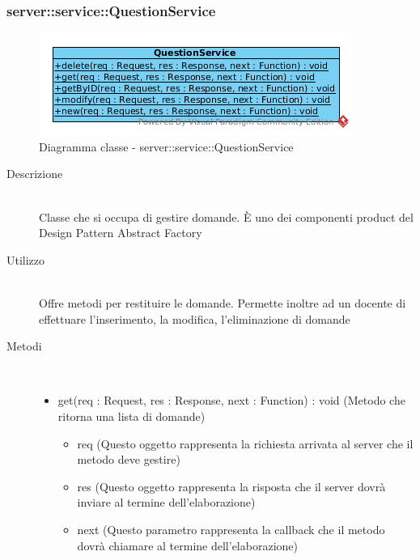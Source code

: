\vspace{0.5cm}
\hypertarget{server::service::QuestionService}{}
\subsubsection[QuestionService]{server::service::QuestionService}
\begin{center}
			\begin{figure}[H]
				\centering \includegraphics[scale=4, max width=\textwidth, max height=\myheight]{../img/diagrammiClassi/server/service/QuestionService.png}
				\caption{Diagramma classe - server::service::QuestionService}
			\end{figure}
		\end{center}\begin{description}
\item[Descrizione] \hfill \\
 Classe che si occupa di gestire domande. È uno dei componenti product del Design Pattern Abstract Factory
\item[Utilizzo] \hfill \\
 Offre metodi per restituire le domande. Permette inoltre ad un docente di effettuare l'inserimento, la modifica, l'eliminazione di domande
\item[Metodi] \hfill \\
 \vspace{-7mm}
\begin{itemize}
\item get(req : Request, res : Response, next : Function) : void (Metodo che ritorna una lista di domande)\begin{itemize}
\item req (Questo oggetto rappresenta la richiesta arrivata al server che il metodo deve gestire)
\item res (Questo oggetto rappresenta la risposta che il server dovrà inviare al termine dell'elaborazione)
\item next (Questo parametro rappresenta la callback che il metodo dovrà chiamare al termine dell’elaborazione)
\end{itemize}


\end{itemize}
\end{description}
